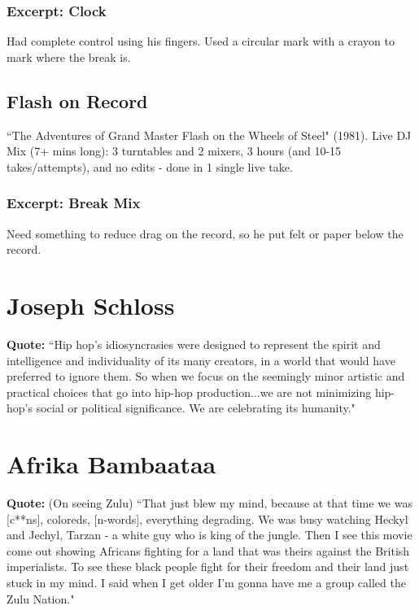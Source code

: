 \documentclass[12pt, a4paper, twoside, openright, titlepage]{book}
\begin{document}
\subsubsection{Excerpt: Clock}

Had complete control using his fingers. Used a circular mark with a crayon to mark where the break is.

\subsection{Flash on Record}


``The Adventures of Grand Master Flash on the Wheels of Steel" (1981). Live DJ Mix (7+ mins long): 3 turntables and 2 mixers, 3 hours (and 10-15 takes/attempts), and no edits - done in 1 single live take.


\subsubsection{Excerpt: Break Mix}

Need something to reduce drag on the record, so he put felt or paper below the record.


\section{Joseph Schloss}

\textbf{Quote:} ``Hip hop's idiosyncrasies were designed to represent the spirit and intelligence and individuality of its many creators, in a world that would have preferred to ignore them. So when we focus on the seemingly minor artistic and practical choices that go into hip-hop production...we are not minimizing hip-hop's social or political significance. We are celebrating its humanity."

\section{Afrika Bambaataa}

\textbf{Quote:} (On seeing Zulu) ``That just blew my mind, because at that time we was [c**ns], coloreds, [n-words], everything degrading. We was busy watching Heckyl and Jechyl, Tarzan - a white guy who is king of the jungle. Then I see this movie come out showing Africans fighting for a land that was theirs against the British imperialists. To see these black people fight for their freedom and their land just stuck in my mind. I said when I get older I'm gonna have me a group called the Zulu Nation."
\end{document}
